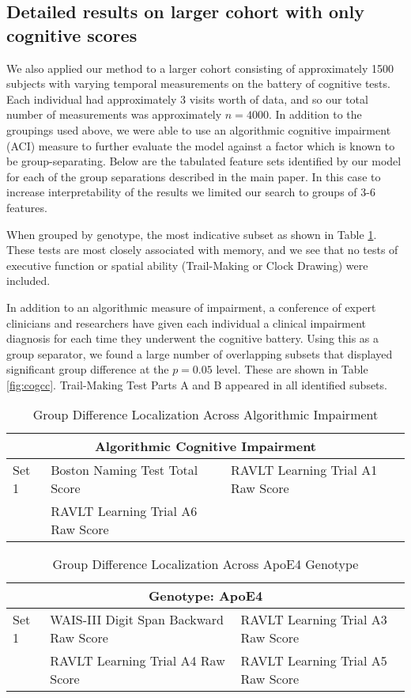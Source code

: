 \subsection*{Detailed results on larger cohort with only cognitive scores}
We also applied our method to a larger cohort consisting of approximately 1500 subjects with varying temporal measurements on the battery of cognitive tests. Each individual had approximately 3 visits worth of data, and so our total number of measurements was approximately $n = 4000$. In addition to the groupings used above, we were able to use an algorithmic cognitive impairment (ACI) measure to further evaluate the model against a factor which is known to be group-separating. Below are the tabulated feature sets identified by our model for each of the group separations described in the main paper. In this case to increase interpretability of the results we limited our search to groups of 3-6 features.

When grouped by genotype, the most indicative subset as shown in Table \ref{fig:coggenotype}. These tests are most closely associated with memory, and we see that no tests of executive function or spatial ability (Trail-Making or Clock Drawing) were included.

In addition to an algorithmic measure of impairment, a conference of expert clinicians and researchers have given each individual a clinical impairment diagnosis for each time they underwent the cognitive battery. Using this as a group separator, we found a large number of overlapping subsets that displayed significant group difference at the $p = 0.05$ level. These are shown in Table \ref{fig:cogcc}. Trail-Making Test Parts A and B appeared in all identified subsets.

\begin{table}[h]
	\centering
	\begin{tabular}{p{0.8cm}p{5.5cm}p{6cm}}
		\toprule
		\multicolumn{3}{c}{\textbf{Algorithmic Cognitive Impairment}}\\ \midrule \midrule
		Set 1 & Boston Naming Test Total Score & RAVLT Learning Trial A1 Raw Score \\ 
		 & RAVLT Learning Trial A6 Raw Score &  \\ \bottomrule
		\bottomrule
	\end{tabular}
	\caption{Group Difference Localization Across Algorithmic Impairment}
\end{table}

\begin{table}[h]
	\centering
	\begin{tabular}{p{0.8cm}p{5.5cm}p{6cm}}
		\toprule
		\multicolumn{3}{c}{\textbf{Genotype: ApoE4}}\\ \midrule \midrule
		Set 1 & WAIS-III Digit Span Backward Raw Score & RAVLT Learning Trial A3 Raw Score \\
		& RAVLT Learning Trial A4 Raw Score & RAVLT Learning Trial A5 Raw Score \\
		\bottomrule
		\bottomrule
	\end{tabular}
	\caption{Group Difference Localization Across ApoE4 Genotype}
	\label{fig:coggenotype}
\end{table}

